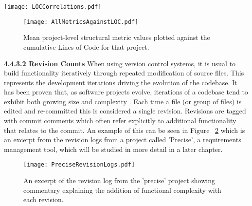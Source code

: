 \begin{table}
\centering 
{}
\begin{tabular}
 \centering 
 \texttt{[image: LOCCorrelations.pdf]}
 \label{tab:LOCCorrelations}
\end{tabular}
\end{table}

\begin{figure}[htbp!] 
\centering    
\texttt{[image: AllMetricsAgainstLOC.pdf]}
\caption{Mean project-level structural metric values plotted against the cumulative Lines of Code for that project.}
\label{fig:AllMetricsAgainstLOC}
\end{figure}

\newline
\textbf{4.4.3.2 Revision Counts}
\newline
When using version control systems, it is usual to build functionality iteratively through repeated modification of source files. This represents the development iterations driving the evolution of the codebase. It has been proven that, as software projects evolve, iterations of a codebase tend to exhibit both growing size and complexity \citep{prather1984axiomatic}. Each time a file (or group of files) is edited and re-committed this is considered a single revision. Revisions are tagged with commit comments which often refer explicitly to additional functionality that relates to the commit. An example of this can be seen in Figure ~\ref{fig:PreciseRevisionLogs} which is an excerpt from the revision logs from a project called 'Precise', a requirements management tool, which will be studied in more detail in a later chapter.

\begin{figure}[htbp!] 
\centering    
\texttt{[image: PreciseRevisionLogs.pdf]}
\caption{An excerpt of the revision log from the 'precise' project showing commentary explaining the addition of functional complexity with each revision.}
\label{fig:PreciseRevisionLogs}
\end{figure}

